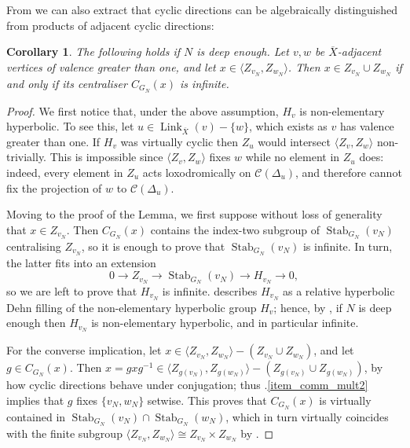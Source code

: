 \documentclass[svgnames]{amsart}
\theoremstyle{plain}
\newtheorem{cor}[thm]{Corollary}
\theoremstyle{definition}
\newcommand{\C}[1]{\mathcal{C}(#1)}
\newcommand{\link}[2]{\operatorname{Link}_{#1}\left(#2\right)}
\newcommand{\Stab}[2]{\operatorname{Stab}_{#1}\left(#2\right)}
\newcommand{\ov}[1]{\overline{#1}}
\begin{document}
\noindent From  we can also extract that cyclic directions can be algebraically distinguished from products of adjacent cyclic directions:
\begin{cor}\label{lem:recognise_(multi)twist} The following holds if $N$ is deep enough. Let $v,w$ be $\ov X$-adjacent vertices of valence greater than one, and let $x\in \langle Z_{v_N}, Z_{w_N}\rangle$. Then $x\in Z_{v_N}\cup  Z_{w_N}$ if and only if its centraliser $C_{G_N}(x)$ is infinite.
\end{cor}

\begin{proof} We first notice that, under the above assumption, $H_v$ is non-elementary hyperbolic. To see this, let $u\in \link{\ov X}{v}-\{w\}$, which exists as $v$ has valence greater than one. If $H_v$ was virtually cyclic then $Z_u$ would intersect $\langle Z_v,Z_w\rangle$ non-trivially. This is impossible since $\langle Z_v,Z_w\rangle$ fixes $w$ while no element in $Z_u$ does: indeed, every element in $Z_u$ acts loxodromically on $\C{\Delta_u}$, and therefore cannot fix the projection of $w$ to $\C{\Delta_u}$. 

Moving to the proof of the Lemma, we first suppose without loss of generality that $x\in Z_{v_N}$. Then $C_{G_N}(x)$ contains the index-two subgroup of $\Stab{G_N}{v_N}$ centralising $Z_{v_N}$, so it is enough to prove that $\Stab{G_N}{v_N}$ is infinite. In turn, the latter fits into an extension 
$$0\to Z_{v_N}\to \Stab{G_N}{v_N}\to H_{v_N}\to 0,$$
so we are left to prove that $H_{v_N}$ is infinite.  describes $H_{v_N}$ as a relative hyperbolic Dehn filling of the non-elementary hyperbolic group $H_v$; hence, by \cite[Corollary 1.6]{Osin_DehnFill}, if $N$ is deep enough then $H_{v_N}$ is non-elementary hyperbolic, and in particular infinite. 

For the converse implication, let $x\in \langle Z_{v_N}, Z_{w_N}\rangle-(Z_{v_N}\cup Z_{w_N})$, and let $g\in C_{G_N}(x)$. Then $x=gxg^{-1}\in \langle Z_{g(v_N)}, Z_{g(w_N)}\rangle-(Z_{g(v_N)}\cup Z_{g(w_N)})$, by how cyclic directions behave under conjugation; thus .\eqref{item_comm_mult2} implies that $g$ fixes $\{v_N,w_N\}$ setwise. This proves that $C_{G_N}(x)$ is virtually contained in $\Stab{G_N}{v_N}\cap\Stab{G_N}{w_N}$, which in turn virtually coincides with the finite subgroup $\langle Z_{v_N}, Z_{w_N}\rangle\cong Z_{v_N}\times Z_{w_N} $ by \cite[Corollary 2.17]{short_HHG:II}.
\end{proof}
\end{document}
